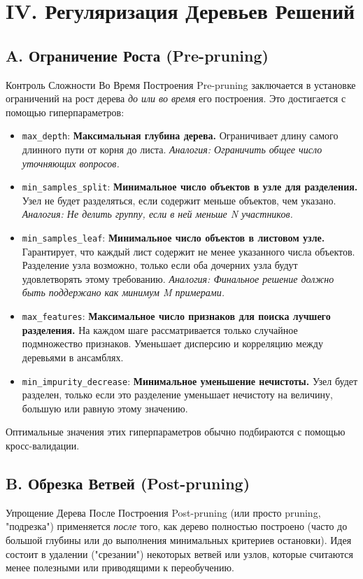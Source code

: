 \section{IV. Регуляризация Деревьев Решений}

\subsection{A. Ограничение Роста (Pre-pruning)}
\begin{myexampleblock}{Контроль Сложности Во Время Построения}
    Pre-pruning заключается в установке ограничений на рост дерева \textit{до или во время} его построения. Это достигается с помощью гиперпараметров:
    \begin{itemize}[nosep, leftmargin=*]
        \item \texttt{max\_depth}: \textbf{Максимальная глубина дерева.} Ограничивает длину самого длинного пути от корня до листа. \textit{Аналогия: Ограничить общее число уточняющих вопросов.}
        \item \texttt{min\_samples\_split}: \textbf{Минимальное число объектов в узле для разделения.} Узел не будет разделяться, если содержит меньше объектов, чем указано. \textit{Аналогия: Не делить группу, если в ней меньше N участников.}
        \item \texttt{min\_samples\_leaf}: \textbf{Минимальное число объектов в листовом узле.} Гарантирует, что каждый лист содержит не менее указанного числа объектов. Разделение узла возможно, только если оба дочерних узла будут удовлетворять этому требованию. \textit{Аналогия: Финальное решение должно быть поддержано как минимум M примерами.}
        \item \texttt{max\_features}: \textbf{Максимальное число признаков для поиска лучшего разделения.} На каждом шаге рассматривается только случайное подмножество признаков. Уменьшает дисперсию и корреляцию между деревьями в ансамблях.
        \item \texttt{min\_impurity\_decrease}: \textbf{Минимальное уменьшение нечистоты.} Узел будет разделен, только если это разделение уменьшает нечистоту на величину, большую или равную этому значению.
    \end{itemize}
    Оптимальные значения этих гиперпараметров обычно подбираются с помощью кросс-валидации.
\end{myexampleblock}

\subsection{B. Обрезка Ветвей (Post-pruning)}
\begin{myblock}{Упрощение Дерева После Построения}
    Post-pruning (или просто pruning, "подрезка") применяется \textit{после} того, как дерево полностью построено (часто до большой глубины или до выполнения минимальных критериев остановки). Идея состоит в удалении ("срезании") некоторых ветвей или узлов, которые считаются менее полезными или приводящими к переобучению.
\end{myblock}


